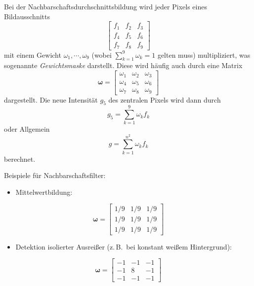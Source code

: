 \documentclass[a4paper, 11pt, accentcolor = tud3b]{tudreport}
\newcommand{\mat}[1]{\boldsymbol{#1}}
\newcommand{\zB}{z.\,B.~}
\begin{document}
						Bei der Nachbarschaftsdurchschnittsbildung wird jeder Pixels eines Bildausschnitts
						\begin{equation*}
							\begin{bmatrix}
								f_1 & f_2 & f_3 \\
								f_4 & f_5 & f_6 \\
								f_7 & f_8 & f_9
							\end{bmatrix}
						\end{equation*}
						mit einem Gewicht \( \omega_1, \cdots, \omega_9 \) (wobei \( \sum_{k = 1}^{9} \omega_k = 1 \) gelten muss) multipliziert, was sogenannte \emph{Gewichtsmaske} darstellt. Diese wird häufig auch durch eine Matrix
						\begin{equation*}
							\mat{\omega} =
								\begin{bmatrix}
									\omega_1 & \omega_2 & \omega_3 \\
									\omega_4 & \omega_5 & \omega_6 \\
									\omega_7 & \omega_8 & \omega_9
								\end{bmatrix}
						\end{equation*}
						dargestellt. Die neue Intensität \( g_5 \) des zentralen Pixels wird dann durch
						\begin{equation*}
							g_5 = \sum_{k = 1}^{9} \omega_k f_k
						\end{equation*}
						oder Allgemein
						\begin{equation*}
							g = \sum_{k = 1}^{n^2} \omega_k f_k
						\end{equation*}
						berechnet.
						
						Beispiele für Nachbarschaftsfilter:
						\begin{itemize}
							\item Mittelwertbildung:
						\end{itemize}
						\begin{equation*}
							\mat{\omega} =
								\begin{bmatrix}
									1/9 & 1/9 & 1/9 \\
									1/9 & 1/9 & 1/9 \\
									1/9 & 1/9 & 1/9
								\end{bmatrix}
						\end{equation*}
						\begin{itemize}
							\item Detektion isolierter Ausreißer (\zB bei konstant weißem Hintergrund):
						\end{itemize}
						\begin{equation*}
							\mat{\omega} =
								\begin{bmatrix}
									-1 & -1 & -1 \\
									-1 &  8 & -1 \\
									-1 & -1 & -1
								\end{bmatrix}
						\end{equation*}
						
\end{document}
